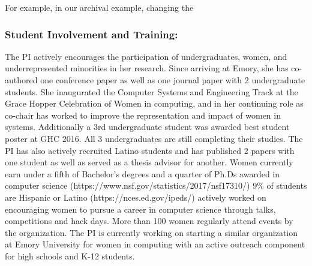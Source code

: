 For example, in our archival example, changing the  


\subsubsection*{Student Involvement and Training: }%
The PI actively encourages the participation of undergraduates, women, and
underrepresented minorities in her research.  Since arriving at Emory, she has
co-authored one conference paper as well as one journal paper with 2
undergraduate students.    
She inaugurated the Computer Systems and Engineering Track at the Grace Hopper
Celebration of Women in computing, and in her continuing role as co-chair has
worked to improve the representation and impact of women in systems.  
Additionally a 3rd undergraduate student was awarded best student
poster at GHC 2016.  All 3 undergraduates are still completing their studies.
The PI has also actively recruited Latino students and has published 2 papers
with one student as well as served as a thesis advisor for another.  
Women currently earn under a fifth of Bachelor's degrees and a quarter of Ph.Ds awarded in computer science
(https://www.nsf.gov/statistics/2017/nsf17310/)
9\% of students are Hispanic or Latino (https://nces.ed.gov/ipeds/)
actively worked on encouraging women to pursue a career in computer science through talks, competitions and hack days.
More than 100 women regularly attend events by the organization.
The PI is currently working on starting a similar organization at Emory University for women in computing with an active outreach component
for high schools and K-12 students.%


